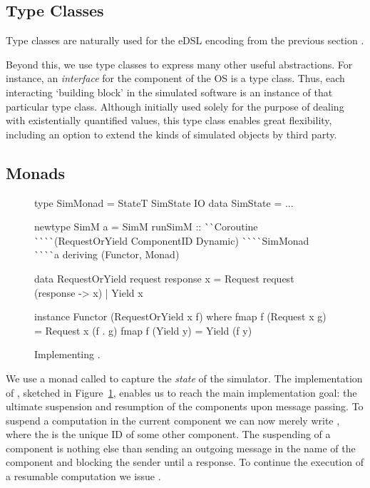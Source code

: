 \subsection{Type Classes}
Type classes are naturally used for the eDSL encoding from the previous section \cite{Hall:1996:TCH:227699.227700,final_tagless_embedding}.

Beyond this, we use type classes to express many other useful abstractions.
For instance, an \emph{interface} for the component of the OS is a type class.
Thus, each interacting `building block' in the simulated software is an instance of that particular type class.
Although initially used solely for the purpose of dealing with existentially quantified values, this  type class enables great flexibility, including an option to extend the kinds of simulated objects by third party.

\subsection{Monads}
\label{sec:impl-monads}
\begin{figure}
\begin{code}
type SimMonad  =  StateT SimState IO
data SimState  = ...

newtype SimM a
  = SimM { runSimM ::
      ^^ ^^ Coroutine
      ^^ ^^ ^^ ^^ (RequestOrYield ComponentID Dynamic)
      ^^ ^^ ^^ ^^ SimMonad
      ^^ ^^ ^^ ^^ a 
    } deriving (Functor, Monad)

data RequestOrYield request response x
  =  Request request (response -> x)
  |  Yield   x

instance Functor (RequestOrYield x f) where
  fmap f (Request x g)  = Request x (f . g)
  fmap f (Yield y)      = Yield (f y)
\end{code}
\vspace{-0.5em}
\caption{Implementing .}
\vspace{-1.5em}
\label{fig:code-simm}
\end{figure}

We use a monad called  to capture the \emph{state} of the simulator.
The implementation of \hspace{-1pt}, sketched in Figure~\ref{fig:code-simm}, enables us to reach the main implementation goal: the ultimate suspension and resumption of the components upon message passing.
To suspend a computation in the current component we can now merely write , where the  is the unique ID of some other component.
The suspending of a component is nothing else than sending an outgoing message in the name of the component and blocking the sender until a response.
To continue the execution of a resumable computation we issue  \mbox{.} %


